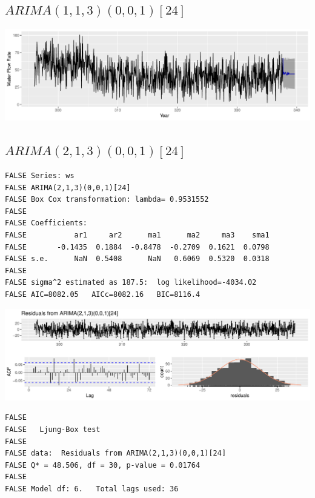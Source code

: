 \documentclass[openany]{book}
\begin{document}
\hypertarget{arima11300124}{%
\subsection{\texorpdfstring{\(ARIMA(1,1,3)(0,0,1)[24]\)}{ARIMA(1,1,3)(0,0,1){[}24{]}}}\label{arima11300124}}

\includegraphics{Group2_Project1_Fall2019_files/figure-latex/unnamed-chunk-23-1.pdf}

\hypertarget{arima21300124}{%
\subsection{\texorpdfstring{\(ARIMA(2,1,3)(0,0,1)[24]\)}{ARIMA(2,1,3)(0,0,1){[}24{]}}}\label{arima21300124}}

\begin{verbatim}
FALSE Series: ws 
FALSE ARIMA(2,1,3)(0,0,1)[24] 
FALSE Box Cox transformation: lambda= 0.9531552 
FALSE 
FALSE Coefficients:
FALSE           ar1     ar2      ma1      ma2     ma3    sma1
FALSE       -0.1435  0.1884  -0.8478  -0.2709  0.1621  0.0798
FALSE s.e.      NaN  0.5408      NaN   0.6069  0.5320  0.0318
FALSE 
FALSE sigma^2 estimated as 187.5:  log likelihood=-4034.02
FALSE AIC=8082.05   AICc=8082.16   BIC=8116.4
\end{verbatim}

\includegraphics{Group2_Project1_Fall2019_files/figure-latex/unnamed-chunk-24-1.pdf}

\begin{verbatim}
FALSE 
FALSE   Ljung-Box test
FALSE 
FALSE data:  Residuals from ARIMA(2,1,3)(0,0,1)[24]
FALSE Q* = 48.506, df = 30, p-value = 0.01764
FALSE 
FALSE Model df: 6.   Total lags used: 36
\end{verbatim}
\end{document}
